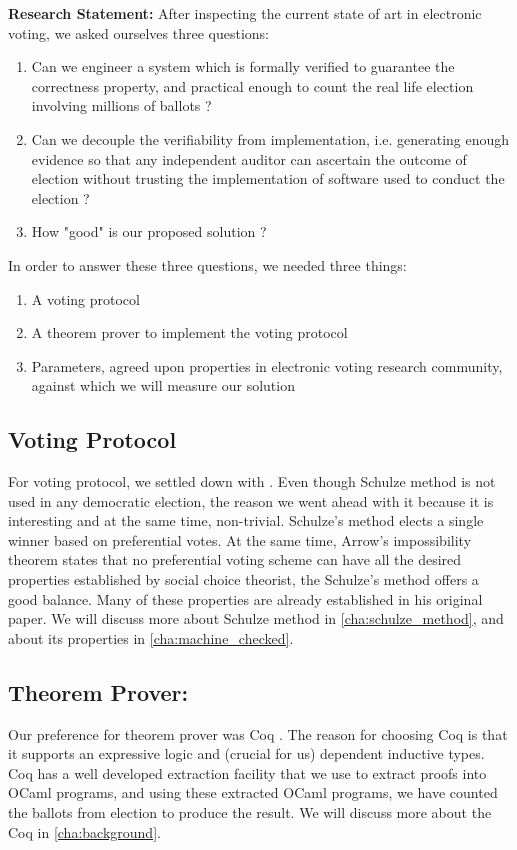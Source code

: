  
\textbf{Research Statement:}
After inspecting the current state of art in electronic voting, we 
 asked ourselves three questions:
 \begin{enumerate}
  \item Can we engineer a system which is formally verified to 
    guarantee the correctness property, and practical enough
    to count the real life election involving millions of ballots ? 
 \item  Can we decouple the verifiability from implementation, i.e. 
    generating enough evidence so that any independent auditor can 
    ascertain the outcome of election without trusting the implementation 
    of software used to conduct the election ? 
  \item How "good"  is our proposed solution ?
  \end{enumerate}
  
  
 In order to answer these three questions, we needed three things:
\begin{enumerate}
  \item A voting protocol
  \item A theorem prover to implement the voting protocol
  \item Parameters, agreed upon properties in electronic voting research community, against which 
  		  we will measure our solution
\end{enumerate} 
 
 \subsection{Voting Protocol}
 For voting protocol, we settled down with \cite{Schulze:2011:NMC}.
 Even though Schulze method is not used in any democratic election, the reason 
 we went ahead with it because it is interesting  and at the same time, non-trivial. 
 Schulze's method elects  a single winner based on 
preferential votes.  At the same time, Arrow's impossibility theorem \citep{Arrow:1950:DCS} states
 that no preferential voting 
scheme can have all the desired properties established by  social choice theorist,
the Schulze's method offers a good balance. Many of these properties are already 
established in his original paper.  We will discuss more about Schulze method in 
\ref{cha:schulze_method}, and about its properties in \ref{cha:machine_checked}. 

\subsection{Theorem Prover:}
Our preference for theorem prover was Coq \citep{Bertot:2004:ITP}. The 
reason for choosing Coq is that it supports an expressive logic and  (crucial for us) dependent 
inductive types.  Coq has a well developed extraction facility that 
we use to extract proofs into OCaml programs, and using these extracted OCaml programs, we 
have counted the ballots from election to produce the result.  We will discuss more about the Coq in 
\ref{cha:background}. 

